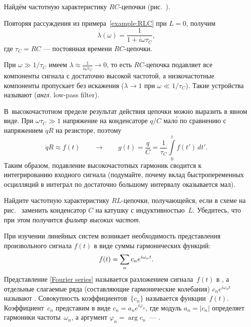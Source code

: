 \begin{lab:example}\label{example:RC}
Найдём частотную характеристику $RC$-цепочки (рис.~).

Повторяя рассуждения из примера~\ref{example:RLC} при $L=0$, получим
\begin{equation*}
\lambda(\omega) = \frac{1}{1+i\omega \tau_C},
\end{equation*}
где $\tau_C=RC$ --- постоянная времени $RC$-цепочки.

При $\omega \gg 1/\tau_C$ имеем $\lambda \approx \frac{1}{i\omega\tau_C} \to 0$,
то есть $RC$-цепочка подавляет все компоненты сигнала с достаточно высокой
частотой, а низкочастотные компоненты пропускает без искажения
($\lambda\to1$ при $\omega \ll 1/\tau_C$). 
Такие устройства называют 
(\emph{англ.} low-pass filter).

В~высокочастотном пределе результат действия цепочки можно выразить в явном виде.
При $\omega\tau_C\gg1$ напряжение на конденсаторе $q/C$ мал\'{о} по сравнению
с напряжением $\dot{q}R$ на резисторе, поэтому
\begin{equation*}
\dot{q} R \approx f(t) \qquad \to \qquad g(t) = \frac{q}{C} = \frac{1}{\tau_C}\int\limits_0^t f(t')\,dt'.
\end{equation*}
Таким образом, подавление высокочастотных гармоник сводится к интегрированию
входного сигнала (подумайте, почему вклад быстропеременных осцилляций
в интеграл по достаточно большому интервалу оказывается мал).
\end{lab:example}

\begin{lab:exercise}
    Найдите частотную характеристику $RL$-цепочки,
    получающейся, если в схеме на рис.~ заменить конденсатор $C$
    на катушку с индуктивностью~$L$. Убедитесь, что при этом
    получится \emph{фильтр высоких частот}.
\end{lab:exercise}

\label{sec:spectrum}

При изучении линейных систем возникает необходимость
представления произвольного сигнала $f(t)$ в виде
суммы гармонических функций:
\begin{equation}
    \eqmark{Fourier series}
    f(t)=\sum\limits_n c_n e^{i\omega_n t}.
\end{equation}
Представление \eqref{Fourier series} называется разложением сигнала~$f(t)$ в
, а отдельные слагаемые ряда (составляющие
гармонические колебания) $c_n e^{i\omega_n t}$ называют .
Совокупность коэффициентов~$\{c_n\}$ называется  функции~$f(t)$.
Коэффициент~$c_n$ представим в виде $c_n=a_ne^{i\varphi_n}$, где
модуль $a_n=|c_n|$ определяет  гармоники частоты~$\omega_n$,
а аргумент $\varphi_n=\arg c_n$~--- .

